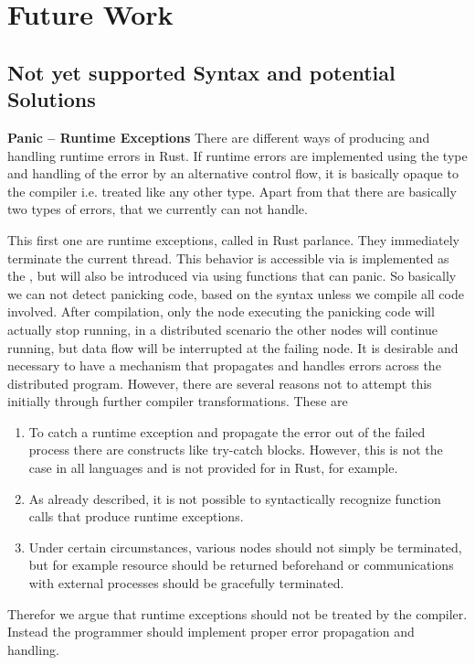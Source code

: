 

\section{Future Work}
\subsection{Not yet supported Syntax and potential Solutions}

\textbf{Panic -- Runtime Exceptions} 
There are different ways of producing and handling runtime errors in Rust. If runtime errors are implemented using the  type and handling of the error by an alternative control flow, it is basically opaque to the compiler i.e. treated like any other type. Apart from that there are basically two types of errors, that we currently can not handle. 

This first one are runtime exceptions, called  in Rust parlance. They immediately terminate the current thread. This behavior is accessible via is implemented as the , but will also be introduced via using functions that can panic. So basically we can not detect panicking code, based on the syntax unless we compile all code involved. After compilation, only the node executing the panicking code will actually stop running, in a distributed scenario the other nodes will continue running, but data flow will be interrupted at the failing node. It is desirable and necessary to have a mechanism that propagates and handles errors across the distributed program. However, there are several reasons not to attempt this initially through further compiler transformations. These are
\begin{enumerate}
    \item To catch a runtime exception and propagate the error out of the failed process there are constructs like try-catch blocks. However, this is not the case in all languages and is not provided for in Rust, for example.
    \item As already described, it is not possible to syntactically recognize function calls that produce runtime exceptions.
    \item Under certain circumstances, various nodes should not simply be terminated, but for example resource should be returned beforehand or communications with external processes should be gracefully terminated.
\end{enumerate}
Therefor we argue that runtime exceptions should not be treated by the compiler. Instead the programmer should implement proper error propagation and handling. 

